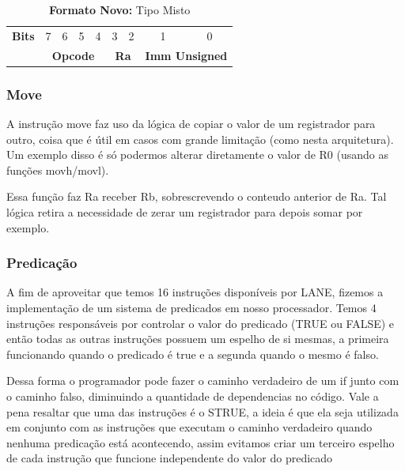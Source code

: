 \documentclass{article}
\begin{document}
    \begin{table}[h]
      \captionsetup{labelformat=empty, skip=0pt}
      \caption{\textbf{Formato Novo:} Tipo Misto}
      \centering
      \begin{tabular}{|c|*{8}{c|}}
        \hline
        \rowcolor{red!50}
        \multicolumn{9}{|c|}{\textbf{Tipo M}} \\ \hline
        \textbf{Bits} & 7 & 6 & 5 & 4 & 3 & 2 & 1 & 0 \\ \hline
        & \multicolumn{4}{c|}{\textbf{Opcode}} & \multicolumn{2}{c|}{\textbf{Ra}} & \multicolumn{2}{c|}{\textbf{Imm Unsigned}} \\ \hline
      \end{tabular}
    \end{table}


    \subsubsection{Move}

    A instrução move faz uso da lógica de copiar o valor de um registrador para outro, coisa que é 
    útil em casos com grande limitação (como nesta arquitetura). Um exemplo disso é só podermos alterar diretamente o valor de R0 (usando as funções movh/movl).
    
    Essa função faz Ra receber Rb, sobrescrevendo o conteudo anterior de Ra. Tal lógica retira a necessidade de zerar um registrador para depois somar por exemplo.

    \subsubsection{Predicação}

    A fim de aproveitar que temos 16 instruções disponíveis por LANE, fizemos a implementação de um sistema de predicados em nosso processador.
    Temos 4 instruções responsáveis por controlar o valor do predicado (TRUE ou FALSE) e então todas as outras instruções possuem um espelho de si mesmas, a primeira funcionando quando o predicado é true e a segunda quando o mesmo é falso.

    Dessa forma o programador pode fazer o caminho verdadeiro de um if junto com o caminho falso, diminuindo a quantidade de dependencias no código.
    Vale a pena resaltar que uma das instruções é o STRUE, a ideia é que ela seja utilizada em conjunto com as instruções que executam o caminho verdadeiro quando nenhuma predicação está acontecendo, assim evitamos criar um terceiro espelho de cada instrução que funcione independente do valor do predicado
\end{document}
